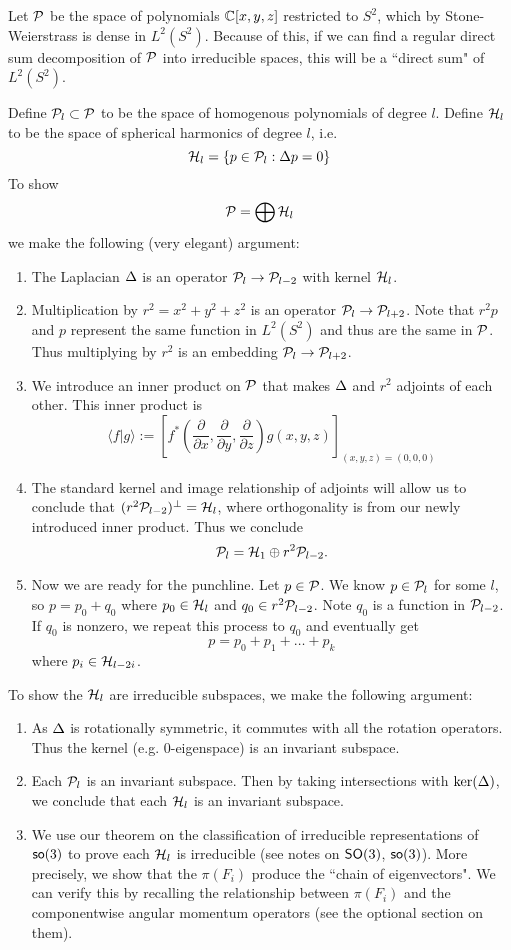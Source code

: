 Let ${\mathcal P}$ be the space of polynomials ${\mathbb C}[x,y,z]$ restricted to $S^2$, which by Stone-Weierstrass is dense in $L^2(S^2)$. Because of this, if we can find a regular direct sum decomposition of ${\mathcal P}$ into irreducible spaces, this will be a ``direct sum" of $L^2(S^2)$.

Define ${\mathcal P}_l \subset {\mathcal P}$ to be the space of homogenous polynomials of degree $l$. Define ${\mathcal H}_l$ to be the space of spherical harmonics of degree $l$, i.e.
\[
    {\mathcal H}_l = \{p \in {\mathcal P}_l: \Delta p = 0\}
\]
To show
\[
    {\mathcal P} = \bigoplus {\mathcal H}_l
\]
we make the following (very elegant) argument:
\begin{enumerate}
    \item The Laplacian $\Delta$ is an operator ${\mathcal P}_l \rightarrow {\mathcal P}_{l-2}$ with kernel ${\mathcal H}_l$.
    \item Multiplication by $r^2 = x^2 + y^2 + z^2$ is an operator ${\mathcal P}_l \rightarrow {\mathcal P}_{l+2}$. Note that $r^2p$ and $p$ represent the same function in $L^2(S^2)$ and thus are the same in ${\mathcal P}$. Thus multiplying by $r^2$ is an embedding ${\mathcal P}_l \rightarrow {\mathcal P}_{l+2}$.
    \item We introduce an inner product on ${\mathcal P}$ that makes $\Delta$ and $r^2$ adjoints of each other. This inner product is
        \[
            \langle f | g \rangle := \left[ f^*\left( \frac{\partial}{\partial x}, \frac{\partial}{\partial y}, \frac{\partial}{\partial z}\right) g(x,y,z) \right]_{(x,y,z) = (0, 0, 0)}
        \]
    \item The standard kernel and image relationship of adjoints will allow us to conclude that $(r^2{\mathcal P}_{l-2})^\perp = {\mathcal H}_l$, where orthogonality is from our newly introduced inner product. Thus we conclude
        \[
            {\mathcal P}_l = {\mathcal H}_1 \oplus r^2{\mathcal P}_{l-2}.
        \]
    \item Now we are ready for the punchline. Let $p \in {\mathcal P}$. We know $p \in {\mathcal P}_l$ for some $l$, so $p = p_0 + q_0$ where $p_0 \in {\mathcal H}_l$ and $q_0 \in r^2{\mathcal P}_{l-2}$. Note $q_0$ is a function in ${\mathcal P}_{l-2}$. If $q_0$ is nonzero, we repeat this process to $q_0$ and eventually get
        \[
            p = p_0 + p_1 + \dots + p_k
        \]
        where $p_i \in {\mathcal H}_{l-2i}$.
\end{enumerate}
To show the ${\mathcal H}_l$ are irreducible subspaces, we make the following argument:
\begin{enumerate}
    \item As $\Delta$ is rotationally symmetric, it commutes with all the rotation operators. Thus the kernel (e.g. 0-eigenspace) is an invariant subspace.
    \item Each ${\mathcal P}_l$ is an invariant subspace. Then by taking intersections with $\ker(\Delta)$, we conclude that each ${\mathcal H}_l$ is an invariant subspace.
    \item We use our theorem on the classification of irreducible representations of $\operatorname{\textsf{so}}(3)$ to prove each ${\mathcal H}_l$ is irreducible (see notes on $\operatorname{\textsf{SO}}(3)$, $\operatorname{\textsf{so}}(3)$). More precisely, we show that the $\pi(F_i)$ produce the ``chain of eigenvectors". We can verify this by recalling the relationship between $\pi(F_i)$ and the componentwise angular momentum operators (see the optional section on them).
\end{enumerate}

